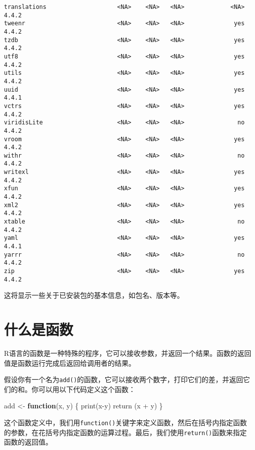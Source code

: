 \documentclass[
  letterpaper,
  DIV=11,
  numbers=noendperiod]{scrreprt}
\newenvironment{Shaded}{\begin{snugshade}}{\end{snugshade}}
\newcommand{\ControlFlowTok}[1]{\textcolor[rgb]{0.00,0.23,0.31}{\textbf{#1}}}
\newcommand{\FunctionTok}[1]{\textcolor[rgb]{0.28,0.35,0.67}{#1}}
\newcommand{\NormalTok}[1]{\textcolor[rgb]{0.00,0.23,0.31}{#1}}
\newcommand{\OtherTok}[1]{\textcolor[rgb]{0.00,0.23,0.31}{#1}}
\newcommand{\SpecialCharTok}[1]{\textcolor[rgb]{0.37,0.37,0.37}{#1}}
\begin{document}
\begin{verbatim}
translations                    <NA>    <NA>   <NA>             <NA> 4.4.2
tweenr                          <NA>    <NA>   <NA>              yes 4.4.2
tzdb                            <NA>    <NA>   <NA>              yes 4.4.2
utf8                            <NA>    <NA>   <NA>              yes 4.4.2
utils                           <NA>    <NA>   <NA>              yes 4.4.2
uuid                            <NA>    <NA>   <NA>              yes 4.4.1
vctrs                           <NA>    <NA>   <NA>              yes 4.4.2
viridisLite                     <NA>    <NA>   <NA>               no 4.4.2
vroom                           <NA>    <NA>   <NA>              yes 4.4.2
withr                           <NA>    <NA>   <NA>               no 4.4.2
writexl                         <NA>    <NA>   <NA>              yes 4.4.2
xfun                            <NA>    <NA>   <NA>              yes 4.4.2
xml2                            <NA>    <NA>   <NA>              yes 4.4.2
xtable                          <NA>    <NA>   <NA>               no 4.4.2
yaml                            <NA>    <NA>   <NA>              yes 4.4.1
yarrr                           <NA>    <NA>   <NA>               no 4.4.2
zip                             <NA>    <NA>   <NA>              yes 4.4.2
\end{verbatim}

这将显示一些关于已安装包的基本信息，如包名、版本等。

\chapter{什么是函数}\label{ux4ec0ux4e48ux662fux51fdux6570}

R语言的函数是一种特殊的程序，它可以接收参数，并返回一个结果。函数的返回值是函数运行完成后返回给调用者的结果。

假设你有一个名为\texttt{add()}的函数，它可以接收两个数字，打印它们的差，并返回它们的和。你可以用以下代码定义这个函数：

\begin{Shaded}
\begin{Highlighting}[]
\NormalTok{add }\OtherTok{\textless{}{-}} \ControlFlowTok{function}\NormalTok{(x, y) \{}
  \FunctionTok{print}\NormalTok{(x}\SpecialCharTok{{-}}\NormalTok{y)}
  \FunctionTok{return}\NormalTok{ (x }\SpecialCharTok{+}\NormalTok{ y)}
\NormalTok{\}}
\end{Highlighting}
\end{Shaded}

这个函数定义中，我们用\texttt{function()}关键字来定义函数，然后在括号内指定函数的参数，在花括号内指定函数的运算过程。最后，我们使用\texttt{return()}函数来指定函数的返回值。
\end{document}
